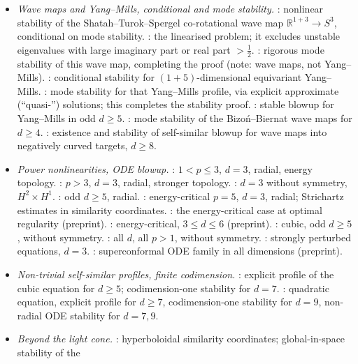 \begin{itemize}[leftmargin=1.2em,itemsep=1pt]
\item \emph{Wave maps and Yang--Mills, conditional and mode stability.}
\cite{Donninger2011}: nonlinear stability of the Shatah--Turok--Spergel
co-rotational wave map $\mathbb{R}^{1+3}\to S^3$, conditional on mode
stability. \cite{DonningerSchoerkhuberAichelburg2012}: the linearised
problem; it excludes unstable eigenvalues with large imaginary part or real
part $>\frac12$. \cite{CostinDonningerXia2016}: rigorous mode stability of
this wave map, completing the proof (note: wave maps, not Yang--Mills).
\cite{Donninger2014}: conditional stability for $(1+5)$-dimensional
equivariant Yang--Mills. \cite{CostinEtAl2016}: mode stability for that
Yang--Mills profile, via explicit approximate (``quasi-'') solutions; this
completes the stability proof. \cite{Glogic2022}: stable blowup for
Yang--Mills in odd $d\ge5$.
\cite{CostinDonningerGlogic2017}: mode stability of the Bizo\'n--Biernat
wave maps for $d\ge4$. \cite{DonningerGlogic2019}: existence and stability
of self-similar blowup for wave maps into negatively curved targets, $d\ge8$.
\item \emph{Power nonlinearities, ODE blowup.} \cite{DonningerSchoerkhuber2012}:
$1<p\le3$, $d=3$, radial, energy topology.
\cite{DonningerSchoerkhuber2014}: $p>3$, $d=3$, radial, stronger topology.
\cite{DonningerSchoerkhuber2016}: $d=3$ without symmetry, $H^2\times H^1$. \cite{DonningerSchoerkhuber2017}: odd $d\ge5$,
radial. \cite{Donninger2017}: energy-critical $p=5$, $d=3$, radial; Strichartz
estimates in similarity coordinates. \cite{DonningerRao2018}: the energy-critical
case at optimal regularity (preprint). \cite{Wallauch2022}: energy-critical,
$3\le d\le6$ (preprint). \cite{ChatzikaleasDonninger2019}: cubic, odd
$d\ge5$, without symmetry. \cite{Ostermann2024}: all $d$, all $p>1$, without
symmetry. \cite{DonningerWallauch2021}: strongly perturbed equations, $d=3$.
\cite{Liu2025}: superconformal ODE family in all dimensions (preprint).
\item \emph{Non-trivial self-similar profiles, finite codimension.}
\cite{GlogicSchoerkhuber2021}: explicit profile of the cubic equation for
$d\ge5$; codimension-one stability for $d=7$.
\cite{CsoboGlogicSchoerkhuber2024}: quadratic equation, explicit profile for
$d\ge7$, codimension-one stability for $d=9$, non-radial ODE stability for
$d=7,9$.
\item \emph{Beyond the light cone.} \cite{BiernatDonningerSchoerkhuber2021}:
hyperboloidal similarity coordinates; global-in-space stability of the

\end{itemize}
